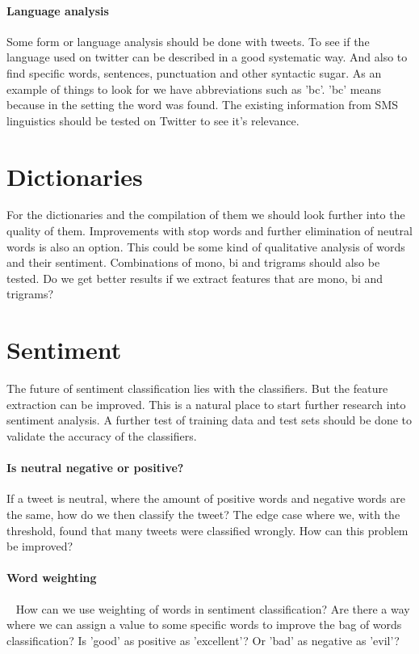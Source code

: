 \paragraph{Language analysis}
Some form or language analysis should be done with tweets. To see if the
language used on twitter can be described in a good systematic way. And also to
find specific words, sentences, punctuation and other syntactic sugar. 
As an example of things to look for we have abbreviations such as 'bc'. 'bc'
means because in the setting the word was found. The existing information from
SMS linguistics should be tested on Twitter to see it's relevance.
%

\section{Dictionaries}\label{future_work:dictionaries}
For the dictionaries and the compilation of them we should look further into
the quality of them. Improvements with stop words and further elimination of
neutral words is also an option. This could be some kind of qualitative
analysis of words and their sentiment. Combinations of mono, bi and trigrams
should also be tested. Do we get better results if we extract features that are
mono, bi and trigrams? 
%

\section{Sentiment}\label{future_work:sentiment}
The future of sentiment classification lies with the classifiers. But the
feature extraction can be improved. This is a natural place to start further
research into sentiment analysis. A further test of training data and test sets
should be done to validate the accuracy of the classifiers.   
 
\paragraph{Is neutral negative or positive?}
If a tweet is neutral, where the amount of positive words and
negative words are the same, how do we then classify the tweet? The edge case
where we, with the threshold, found that many tweets were classified wrongly.
How can this problem be improved?

\paragraph{Word weighting} 
How can we use weighting of words in sentiment classification? Are there a way
where we can assign a value to some specific words to improve the bag of words
classification? Is 'good' as positive as 'excellent'? Or 'bad' as negative as
'evil'? 

